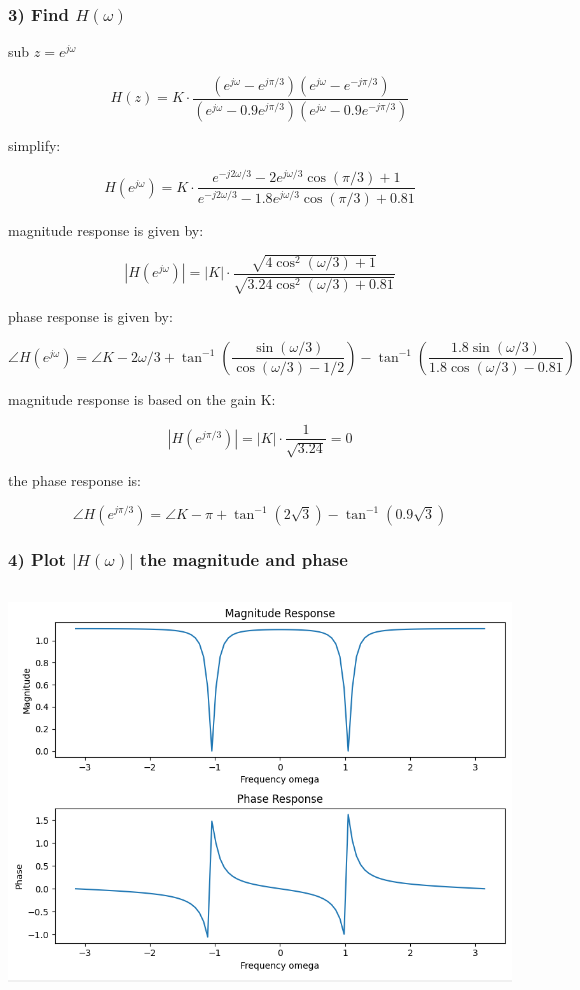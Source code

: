 \documentclass[12pt,letterpaper]{article}
\begin{document}
\subsubsection*{3) Find $H(\omega)$ }
\begin{center}
sub $z = e^{j\omega}$

$$H(z) = K \cdot \frac{(e^{j\omega} - e^{j\pi/3})(e^{j\omega} - e^{-j\pi/3})}{(e^{j\omega} - 0.9e^{j\pi/3})(e^{j\omega} - 0.9e^{-j\pi/3})}$$

simplify:

$$H(e^{j\omega}) = K \cdot \frac{e^{-j2\omega/3} - 2e^{j\omega/3}\cos(\pi/3) + 1}{e^{-j2\omega/3} - 1.8e^{j\omega/3}\cos(\pi/3) + 0.81}$$

magnitude response is given by:

$$|H(e^{j\omega})| = |K| \cdot \frac{\sqrt{4\cos^2(\omega/3) + 1}}{\sqrt{3.24\cos^2(\omega/3) + 0.81}}$$

phase response is given by:

$$\angle H(e^{j\omega}) = \angle K - 2\omega/3 + \tan^{-1}\left(\frac{\sin(\omega/3)}{\cos(\omega/3) - 1/2}\right) - \tan^{-1}\left(\frac{1.8\sin(\omega/3)}{1.8\cos(\omega/3) - 0.81}\right)$$

magnitude response is based on the gain K:

$$|H(e^{j\pi/3})| = |K| \cdot \frac{1}{\sqrt{3.24}} = 0$$

the phase response is:

$$\angle H(e^{j\pi/3}) = \angle K - \pi + \tan^{-1}(2\sqrt{3}) - \tan^{-1}(0.9\sqrt{3})$$
\end{center}
\newpage
\subsubsection*{4) Plot $|H(\omega)|$ the magnitude and phase}
\inputminted[frame=lines,framesep=2mm,baselinestretch=1.2,bgcolor=LightGray,breaklines,fontsize=\tiny,linenos]{python}{p1p3.py}
\includegraphics*[scale=0.5]{p1p3.png}
\newpage
\end{document}
